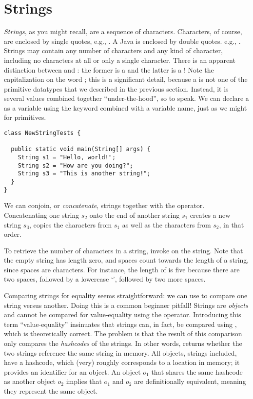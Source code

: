 \section{Strings}

\textit{Strings}, as you might recall, are a sequence of characters. Characters, of course, are enclosed by single quotes, e.g., . A Java  is enclosed by double quotes. e.g., . Strings may contain any number of characters and any kind of character, including no characters at all or only a single character. There is an apparent distinction between  and : the former is a  and the latter is a ! Note the capitalization on the word ; this is a significant detail, because a  is not one of the primitive datatypes that we described in the previous section. Instead, it is several  values combined together ``under-the-hood'', so to speak. We can declare a  as a variable using the keyword combined with a variable name, just as we might for primitives. 

\begin{cl}[]{}
\begin{lstlisting}[language=MyJava]
class NewStringTests {

  public static void main(String[] args) {
    String s1 = "Hello, world!";
    String s2 = "How are you doing?";
    String s3 = "This is another string!";
  }
}
\end{lstlisting}
\end{cl}

We can conjoin, or \textit{concatenate}, strings together with the \ttt{+} operator. Concatenating one string $s_2$ onto the end of another string $s_1$ creates a new string $s_3$, copies the characters from $s_1$ as well as the characters from $s_2$, in that order. 

To retrieve the number of characters in a string, invoke  on the string. Note that the empty string has length zero, and spaces count towards the length of a string, since spaces are characters. For instance, the length of  is five because there are two spaces, followed by a lowercase `', followed by two more spaces.

Comparing strings for equality seems straightforward: we can use \ttt{==} to compare one string versus another. Doing this is a common beginner pitfall! Strings are \textit{objects} and cannot be compared for value-equality using the \ttt{==} operator. Introducing this term ``value-equality'' insinuates that strings can, in fact, be compared using \ttt{==}, which is theoretically correct. The problem is that the result of this comparison only compares the \textit{hashcodes} of the strings. In other words,  returns whether the two strings reference the same string in memory. All objects, strings included, have a hashcode, which (very) roughly corresponds to a location in memory; it provides an identifier for an object. An object $o_1$ that shares the same hashcode as another object $o_2$ implies that $o_1$ and $o_2$ are definitionally equivalent, meaning they represent the same object.
 
